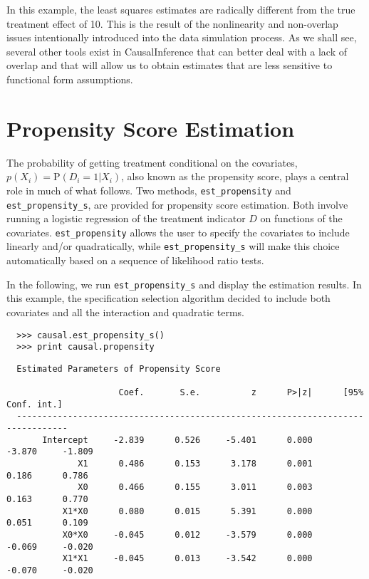 \documentclass[12pt]{article}
\renewcommand{\P}{\mathrm{P}}
\theoremstyle{definition}
\theoremstyle{definition}
\theoremstyle{definition}
\theoremstyle{remark}
\begin{document}
In this example, the least squares estimates are radically different from the true treatment effect of 10. This is the result of the nonlinearity and non-overlap issues intentionally introduced into the data simulation process. As we shall see, several other tools exist in CausalInference that can better deal with a lack of overlap and that will allow us to obtain estimates that are less sensitive to functional form assumptions.


\section{Propensity Score Estimation} \label{sec.c}

The probability of getting treatment conditional on the covariates, $p(X_i) = \P(D_i=1|X_i)$, also known as the propensity score, plays a central role in much of what follows. Two methods, \texttt{est\_propensity} and \texttt{est\_propensity\_s}, are provided for propensity score estimation. Both involve running a logistic regression of the treatment indicator $D$ on functions of the covariates. \texttt{est\_propensity} allows the user to specify the covariates to include linearly and/or quadratically, while \texttt{est\_propensity\_s} will make this choice automatically based on a sequence of likelihood ratio tests.

In the following, we run \texttt{est\_propensity\_s} and display the estimation results. In this example, the specification selection algorithm decided to include both covariates and all the interaction and quadratic terms.

\begin{verbatim}
  >>> causal.est_propensity_s()
  >>> print causal.propensity
\end{verbatim}
\begin{verbatim}
  Estimated Parameters of Propensity Score
  
                      Coef.       S.e.          z      P>|z|      [95% Conf. int.]
  --------------------------------------------------------------------------------
       Intercept     -2.839      0.526     -5.401      0.000     -3.870     -1.809
              X1      0.486      0.153      3.178      0.001      0.186      0.786
              X0      0.466      0.155      3.011      0.003      0.163      0.770
           X1*X0      0.080      0.015      5.391      0.000      0.051      0.109
           X0*X0     -0.045      0.012     -3.579      0.000     -0.069     -0.020
           X1*X1     -0.045      0.013     -3.542      0.000     -0.070     -0.020
\end{verbatim}
\end{document}
